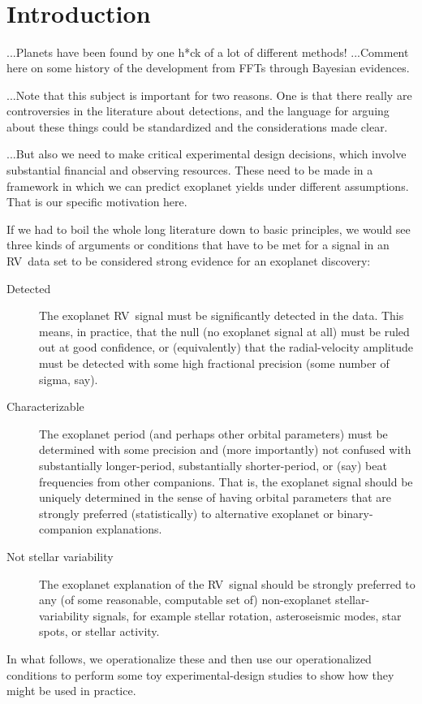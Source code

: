 \documentclass[modern]{aastex63}
\newcommand{\acronym}[1]{{\small{#1}}}
\newcommand{\rv}{\acronym{RV}}
\begin{document}

\section*{~}\clearpage
\section{Introduction} \label{sec:intro}

...Planets have been found by one h*ck of a lot of different methods!
...Comment here on some history of the development from \acronym{FFT}s
through Bayesian evidences.

...Note that this subject is important for two reasons. One is that
there really are controversies in the literature about detections, and
the language for arguing about these things could be standardized and
the considerations made clear.

...But also we need to make critical experimental design decisions,
which involve substantial financial and observing resources. These
need to be made in a framework in which we can predict exoplanet
yields under different assumptions. That is our specific motivation here.

If we had to boil the whole long literature down to basic principles,
we would see three kinds of arguments or conditions that have to be
met for a signal in an \rv\ data set to be considered strong evidence
for an exoplanet discovery:
\begin{description}
\item[Detected]
The exoplanet \rv\ signal must be significantly detected in the
data. This means, in practice, that the null (no exoplanet signal at
all) must be ruled out at good confidence, or (equivalently) that the
radial-velocity amplitude must be detected with some high fractional
precision (some number of sigma, say).
\item[Characterizable]
The exoplanet period (and perhaps other orbital parameters) must be
determined with some precision and (more importantly) not confused
with substantially longer-period, substantially shorter-period, or
(say) beat frequencies from other companions. That is, the exoplanet
signal should be uniquely determined in the sense of having orbital
parameters that are strongly preferred (statistically) to alternative
exoplanet or binary-companion explanations.
\item[Not stellar variability]
The exoplanet explanation of the \rv\ signal should be strongly
preferred to any (of some reasonable, computable set of) non-exoplanet
stellar-variability signals, for example stellar rotation,
asteroseismic modes, star spots, or stellar activity.
\end{description}
In what follows, we operationalize these and then use our
operationalized conditions to perform some toy experimental-design
studies to show how they might be used in practice.
\end{document}
